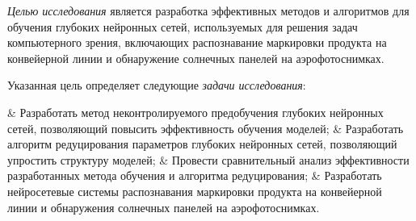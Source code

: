 \vspace{3mm}
\aim
\vspace{3mm}

\textit{Целью исследования} является разработка эффективных методов и алгоритмов для обучения глубоких нейронных сетей, используемых для решения задач компьютерного зрения, включающих распознавание маркировки продукта на конвейерной линии и обнаружение солнечных панелей на аэрофотоснимках.

Указанная цель определяет следующие \textit{задачи исследования}:
\begin{easylistNum}
	& Разработать метод неконтролируемого предобучения глубоких нейронных сетей, позволяющий повысить эффективность обучения моделей;
	& Разработать алгоритм редуцирования параметров глубоких нейронных сетей, позволяющий упростить структуру моделей;
	& Провести сравнительный анализ эффективности разработанных метода обучения и алгоритма редуцирования;
	& Разработать нейросетевые системы распознавания маркировки продукта на конвейерной линии и обнаружения солнечных панелей на аэрофотоснимках.
\end{easylistNum}




